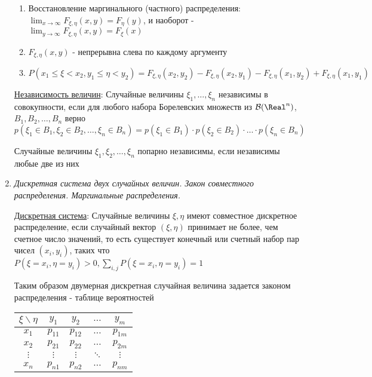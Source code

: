 \begin{enumerate}
\begin{enumerate}
        \item Восстановление маргинального (частного) распределения: 
        $\lim_{x \to \infty} F_{\xi, \eta}(x, y) = F_\eta(y)$, и наоборот - $\lim_{y \to \infty} F_{\xi, \eta}(x, y) = F_\xi(x)$

        \item $F_{\xi, \eta}(x, y)$ - непрерывна слева по каждому аргументу

        \item $P(x_1 \leq \xi < x_2, y_1 \leq \eta < y_2) = F_{\xi, \eta}(x_2, y_2) - F_{\xi, \eta}(x_2, y_1) - F_{\xi, \eta}(x_1, y_2) + F_{\xi, \eta}(x_1, y_1)$
    \end{enumerate}

    \hyperlink{randomvariablesindependence}{Независимость величин}: Случайные величины $\xi_1, \dots, \xi_n$ независимы в совокупности, если для любого набора Борелевских множеств из
    $\mathcal{B}(\Real^n)$, $B_1, B_2, \dots, B_n$ верно $p(\xi_1 \in B_1, \xi_2 \in B_2, \dots, \xi_n \in B_n) = p(\xi_1 \in B_1) \cdot p(\xi_2 \in B_2) \cdot \dots \cdot p(\xi_n \in B_n)$

    Случайные величины $\xi_1, \xi_2, \dots, \xi_n$ попарно независимы, если независимы любые две из них

    \item \textit{Дискретная система двух случайных величин. Закон совместного распределения. Маргинальные распределения.}

    \hyperlink{discretesystemoftwovariables}{Дискретная система}: Случайные величины $\xi, \eta$ имеют совместное дискретное распределение, если случайный вектор $(\xi, \eta)$
    принимает не более, чем счетное число значений, то есть существует конечный или счетный набор пар чисел $(x_i, y_i)$, 
    таких что $P(\xi = x_i, \eta = y_i) > 0, \sum_{i, j} P(\xi = x_i, \eta = y_i) = 1$
    
    Таким образом двумерная дискретная случайная величина задается законом распределения - таблице вероятностей

    \begin{tabular}{c|c|c|c|c}
        $\xi \backslash \eta$ & $y_1$ & $y_2$ & $\dots$ & $y_m$ \\
        \hline
        $x_1$ & $p_{11}$ & $p_{12}$ & $\dots$ & $p_{1m}$ \\
        \hline
        $x_2$ & $p_{21}$ & $p_{22}$ & $\dots$ & $p_{2m}$ \\
        \hline
        $\vdots$ & $\vdots$ & $\vdots$ & $\ddots$ & $\vdots$ \\
        \hline
        $x_n$ & $p_{n1}$ & $p_{n2}$ & $\dots$ & $p_{nm}$ \\
    \end{tabular}


\end{enumerate}
